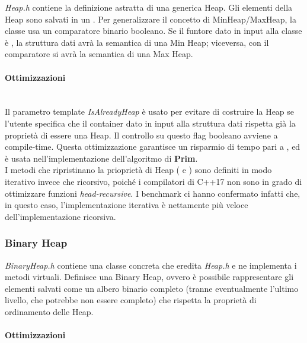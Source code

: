 \textit{Heap.h} contiene la definizione astratta di una generica Heap.
Gli elementi della Heap sono salvati in un .
Per generalizzare il concetto di MinHeap/MaxHeap, la classe usa un comparatore binario booleano. Se il funtore dato in input alla classe è
, la struttura dati avrà la semantica di una Min Heap; viceversa, con il comparatore  si avrà la semantica di una Max Heap.

\paragraph{Ottimizzazioni}\mbox{} \\

\noindent Il parametro template \textit{IsAlreadyHeap} è usato per evitare di costruire la Heap se l'utente specifica che il container dato in input alla struttura dati rispetta già la proprietà di essere una Heap. Il controllo su questo flag booleano avviene a compile-time. Questa ottimizzazione garantisce un risparmio di tempo pari a \complexityN{}, ed è usata nell'implementazione dell'algoritmo di \textbf{Prim}. \\

\noindent I metodi che ripristinano la prioprietà di Heap ( e ) sono definiti in modo iterativo invece che ricorsivo, poiché i compilatori di C++17 non sono in grado di ottimizzare funzioni \textit{head-recursive}. I benchmark ci hanno confermato infatti che, in questo caso, l'implementazione iterativa è nettamente più veloce dell'implementazione ricorsiva.

\subsubsection{Binary Heap}

\textit{BinaryHeap.h} contiene una classe concreta che eredita \textit{Heap.h} e ne implementa i metodi virtuali. Definisce una Binary Heap, ovvero è possibile rappresentare gli elementi salvati come un albero binario completo (tranne eventualmente l'ultimo livello, che potrebbe non essere completo) che rispetta la proprietà di ordinamento delle Heap.

\paragraph{Ottimizzazioni}\mbox{} \\

